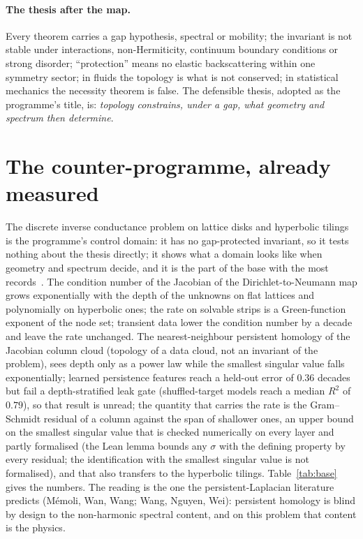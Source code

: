 \documentclass[11pt,a4paper]{article}
\begin{document}
\paragraph{The thesis after the map.} Every theorem carries a gap hypothesis, spectral or mobility; the invariant is not stable under interactions, non-Hermiticity, continuum boundary conditions or strong disorder; ``protection'' means no elastic backscattering within one symmetry sector; in fluids the topology is what is not conserved; in statistical mechanics the necessity theorem is false. The defensible thesis, adopted as the programme's title, is: \emph{topology constrains, under a gap, what geometry and spectrum then determine}.

\section{The counter-programme, already measured}\label{sec:counter}
The discrete inverse conductance problem on lattice disks and hyperbolic tilings is the programme's control domain: it has no gap-protected invariant, so it tests nothing about the thesis directly; it shows what a domain looks like when geometry and spectrum decide, and it is the part of the base with the most records~\cite{Preprint,StripPaper,Paper2,Paper3}. The condition number of the Jacobian of the Dirichlet-to-Neumann map grows exponentially with the depth of the unknowns on flat lattices and polynomially on hyperbolic ones; the rate on solvable strips is a Green-function exponent of the node set; transient data lower the condition number by a decade and leave the rate unchanged. The nearest-neighbour persistent homology of the Jacobian column cloud (topology of a data cloud, not an invariant of the problem), sees depth only as a power law while the smallest singular value falls exponentially; learned persistence features reach a held-out error of $0.36$ decades but fail a depth-stratified leak gate (shuffled-target models reach a median $R^2$ of $0.79$), so that result is unread; the quantity that carries the rate is the Gram--Schmidt residual of a column against the span of shallower ones, an upper bound on the smallest singular value that is checked numerically on every layer and partly formalised (the Lean lemma bounds any $\sigma$ with the defining property by every residual; the identification with the smallest singular value is not formalised), and that also transfers to the hyperbolic tilings. Table~\ref{tab:base} gives the numbers. The reading is the one the persistent-Laplacian literature predicts (Mémoli, Wan, Wang; Wang, Nguyen, Wei): persistent homology is blind by design to the non-harmonic spectral content, and on this problem that content is the physics.
\end{document}
